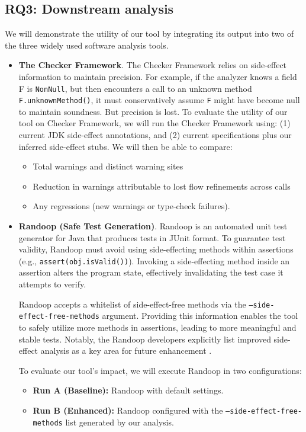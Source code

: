 \subsection{RQ3: Downstream analysis}
We will demonstrate the utility of our tool by integrating its output into two of the three widely used software analysis tools. 
\begin{itemize}
    \item \textbf{The Checker Framework}. The Checker Framework relies on side-effect information to maintain precision. For example, if the analyzer knows a field F is \texttt{NonNull}, but then encounters a call to an unknown method \texttt{F.unknownMethod()}, it must conservatively assume \texttt{F} might have become null to maintain soundness. But precision is lost. 
    To evaluate the utility of our tool on Checker Framework, we will run the Checker Framework using: (1) current JDK side-effect annotations, and (2) current specifications plus our inferred side-effect stubs. We will then be able to compare:
\begin{itemize}
    \item Total warnings and distinct warning sites
    \item Reduction in warnings attributable to lost flow refinements across calls
    \item Any regressions (new warnings or type-check failures).
\end{itemize}

\item \textbf{Randoop (Safe Test Generation)}. Randoop is an automated unit test generator for Java that produces tests in JUnit format. To guarantee test validity, Randoop must avoid using side-effecting methods within assertions (e.g., \texttt{assert(obj.isValid())}). Invoking a side-effecting method inside an assertion alters the program state, effectively invalidating the test case it attempts to verify.

Randoop accepts a whitelist of side-effect-free methods via the \texttt{--side-effect-free-methods} argument. Providing this information enables the tool to safely utilize more methods in assertions, leading to more meaningful and stable tests. Notably, the Randoop developers explicitly list improved side-effect analysis as a key area for future enhancement \cite{RandoopProjectIdeas}.

To evaluate our tool's impact, we will execute Randoop in two configurations: \begin{itemize} \item \textbf{Run A (Baseline):} Randoop with default settings. \item \textbf{Run B (Enhanced):} Randoop configured with the \texttt{--side-effect-free-methods} list generated by our analysis. \end{itemize}


\end{itemize}
